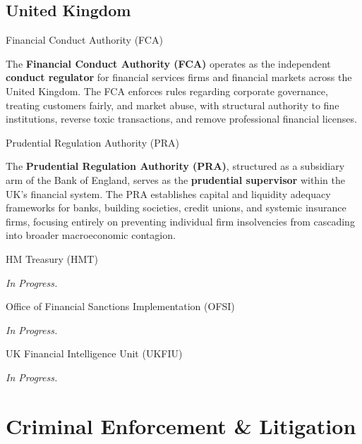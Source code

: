 \documentclass[10pt]{article}
\begin{document}
  \subsection{United Kingdom}
    \label{sec:uk}

    \begin{core}{Financial Conduct Authority (FCA)}

      The \textbf{Financial Conduct Authority (FCA)} operates as the independent \textbf{conduct regulator} for financial services firms and financial markets across the United Kingdom. The FCA enforces rules regarding corporate governance, treating customers fairly, and market abuse, with structural authority to fine institutions, reverse toxic transactions, and remove professional financial licenses.

    \end{core}

    \begin{core}{Prudential Regulation Authority (PRA)}

      The \textbf{Prudential Regulation Authority (PRA)}, structured as a subsidiary arm of the Bank of England, serves as the \textbf{prudential supervisor} within the UK's financial system. The PRA establishes capital and liquidity adequacy frameworks for banks, building societies, credit unions, and systemic insurance firms, focusing entirely on preventing individual firm insolvencies from cascading into broader macroeconomic contagion.

    \end{core}

    \begin{core}{HM Treasury (HMT)}

      \textit{In Progress.}

    \end{core}

    \begin{core}{Office of Financial Sanctions Implementation (OFSI)}

      \textit{In Progress.}

    \end{core}

    \begin{core}{UK Financial Intelligence Unit (UKFIU)}

      \textit{In Progress.}

    \end{core}

\section{Criminal Enforcement \& Litigation}
\end{document}
